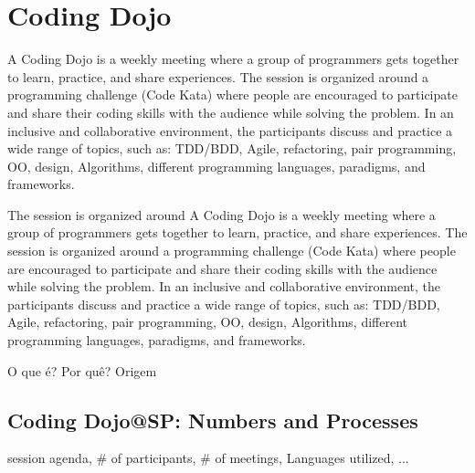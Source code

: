 \section{Coding Dojo}\label{sec:dojo}

A Coding Dojo is a weekly meeting where a group of programmers gets together to learn,
practice, and share experiences. The session is organized around a programming challenge (Code Kata) where people are encouraged to participate and share their coding skills with the audience while solving the problem. In an inclusive and collaborative environment, the participants discuss and practice a wide range of topics, such as: TDD/BDD, Agile, refactoring, pair programming, OO, design, Algorithms, different programming languages, paradigms, and frameworks.

The session is organized around
A Coding Dojo is a weekly meeting where a group of programmers gets together to learn,
practice, and share experiences. The session is organized around a programming challenge (Code Kata) where people are encouraged to participate and share their coding skills with the audience while solving the problem. In an inclusive and collaborative environment, the participants discuss and practice a wide range of topics, such as: TDD/BDD, Agile, refactoring, pair programming, OO, design, Algorithms, different programming languages, paradigms, and frameworks.

O que é?\cite{DojoWiki} Por quê? Origem\cite{DaveThomas}

\subsection{Coding Dojo@SP: Numbers and Processes}\label{subsec:dojosp}

session agenda, \# of participants, \# of meetings, Languages utilized, ...

